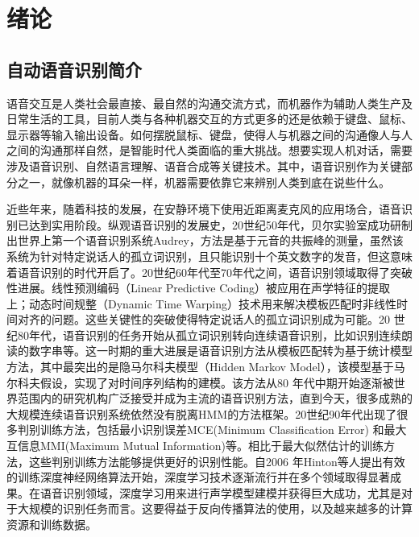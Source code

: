 \chapter{绪论}

\section{自动语音识别简介}
语音交互是人类社会最直接、最自然的沟通交流方式，而机器作为辅助人类生产及日常生活的工具，目前人类与各种机器交互的方式更多的还是依赖于键盘、鼠标、显示器等输入输出设备。如何摆脱鼠标、键盘，使得人与机器之间的沟通像人与人之间的沟通那样自然，是智能时代人类面临的重大挑战。想要实现人机对话，需要涉及语音识别、自然语言理解、语音合成等关键技术。其中，语音识别作为关键部分之一，就像机器的耳朵一样，机器需要依靠它来辨别人类到底在说些什么。

近些年来，随着科技的发展，在安静环境下使用近距离麦克风的应用场合，语音识别已达到实用阶段。纵观语音识别的发展史，20世纪50年代，贝尔实验室成功研制出世界上第一个语音识别系统Audrey\cite{pinola2011speech}，方法是基于元音的共振峰的测量，虽然该系统为针对特定说话人的孤立词识别，且只能识别十个英文数字的发音，但这意味着语音识别的时代开启了。20世纪60年代至70年代之间，语音识别领域取得了突破性进展。线性预测编码（Linear Predictive Coding）被应用在声学特征的提取上\cite{atal1970adaptive}；动态时间规整（Dynamic Time Warping）技术用来解决模板匹配时非线性时间对齐的问题\cite{velichko1970automatic}。这些关键性的突破使得特定说话人的孤立词识别成为可能。20 世纪80年代，语音识别的任务开始从孤立词识别转向连续语音识别，比如识别连续朗读的数字串等。这一时期的重大进展是语音识别方法从模板匹配转为基于统计模型方法，其中最突出的是隐马尔科夫模型（Hidden Markov Model）\cite{rabiner1989tutorial}，该模型基于马尔科夫假设，实现了对时间序列结构的建模。该方法从80 年代中期开始逐渐被世界范围内的研究机构广泛接受并成为主流的语音识别方法，直到今天，很多成熟的大规模连续语音识别系统依然没有脱离HMM的方法框架。20世纪90年代出现了很多判别训练方法，包括最小识别误差MCE(Minimum Classification Error)\cite{juang1997minimum} 和最大互信息MMI(Maximum Mutual Information)\cite{normandin1992hidden}等。相比于最大似然估计的训练方法，这些判别训练方法能够提供更好的识别性能。自2006 年Hinton等人提出有效的训练深度神经网络算法\cite{hinton2006fast}开始，深度学习技术逐渐流行并在多个领域取得显著成果。在语音识别领域，深度学习用来进行声学模型建模并获得巨大成功，尤其是对于大规模的识别任务而言\cite{dahl2012context}\cite{hinton2012deep}。这要得益于反向传播算法的使用，以及越来越多的计算资源和训练数据。
